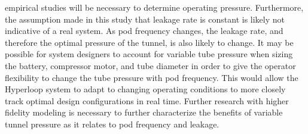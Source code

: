 empirical studies will be necessary to determine operating pressure.
Furthermore, the assumption made in this study that leakage rate is constant is
likely not indicative of a real system. As pod frequency changes, the
leakage rate, and therefore the optimal pressure of the tunnel, is also likely to change.
It may be possible for system designers to account for variable tube pressure
when sizing the battery, compressor motor, and tube diameter in order to give
the operator flexibility to change the tube pressure with pod frequency.
This would allow the Hyperloop system to adapt to changing operating conditions
to more closely track optimal design configurations in real time.
Further research with higher fidelity modeling is necessary to further
characterize the benefits of variable tunnel pressure as it relates to pod frequency and leakage.
